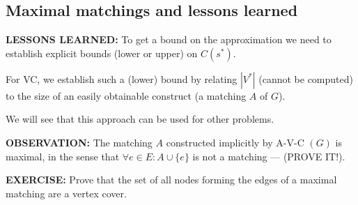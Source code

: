 \subsection{Maximal matchings and lessons learned}
\textbf{LESSONS LEARNED:} To get a bound on the approximation we need to establish explicit bounds (lower or upper) on $C(s^*)$.

For VC, we establish such a (lower) bound by relating $|V^*|$ (cannot be computed) to the size of an easily obtainable construct (a matching $A$ of $G$).

We will see that this approach can be used for other problems.

\textbf{OBSERVATION:} The matching $A$ constructed implicitly by A-V-C $(G)$ is maximal, in the sense that $\forall e\in E:A\cup\{e\}$ is not a matching --- (PROVE IT!).

\textbf{EXERCISE:} Prove that the set of all nodes forming the edges of a maximal matching are a vertex cover.
